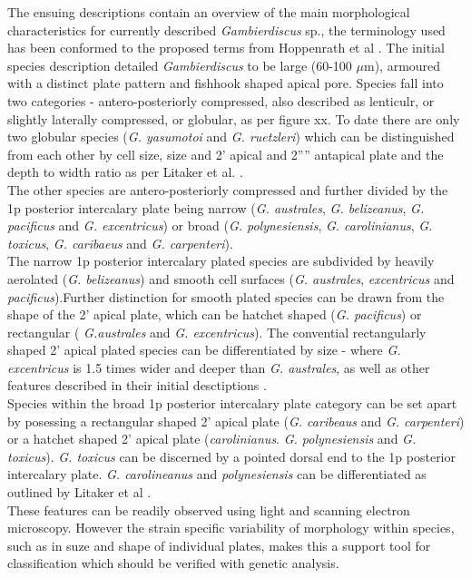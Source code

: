 \documentclass[12pt]{article}
\begin{document}
The ensuing descriptions contain an overview of the main morphological characteristics for currently described \emph{Gambierdiscus} sp., the terminology used has been conformed to the proposed terms from Hoppenrath et al \cite{hoppenrath2013taxonomy}. The initial species description detailed \emph{Gambierdiscus} to be large (60-100 $\mu$m), armoured with a distinct plate pattern and fishhook shaped apical pore. Species fall into two categories - antero-posteriorly compressed, also described as lenticulr, or slightly laterally compressed, or globular, as per figure xx. To date there are only two globular species (\emph{G. yasumotoi} and \emph{G. ruetzleri}) which can be distinguished from each other by cell size, size and 2' apical and 2'''' antapical plate and the depth to width ratio as per Litaker et al. \cite{litaker2009taxonomy}. \\
The other species are antero-posteriorly compressed and further divided by the 1p posterior intercalary plate being narrow (\emph{G. australes}, \emph{G. belizeanus}, \emph{G. pacificus} and \emph{G. excentricus}) or broad (\emph{G. polynesiensis}, \emph{G. carolinianus}, \emph{G. toxicus}, \emph{G. caribaeus} and \emph{G. carpenteri}). \\
The narrow 1p posterior intercalary plated species are subdivided by heavily aerolated (\emph{G. belizeanus}) and smooth cell surfaces (\emph{G. australes}, \emph{excentricus} and \emph{pacificus}).Further distinction for smooth plated species can be drawn from the shape of the 2' apical plate, which can be hatchet shaped (\emph{G. pacificus}) or rectangular ( \emph{G.australes} and \emph{G. excentricus}). The convential rectangularly shaped 2' apical plated species can be differentiated by size - where \emph{G. excentricus} is 1.5 times wider and deeper than \emph{G. australes}, as well as other features described in their initial desctiptions \cite{chinain1999morphology,fraga2011gambierdiscus}. \\
Species within the broad 1p posterior intercalary plate category can be set apart by posessing a rectangular shaped 2' apical plate (\emph{G. caribeaus} and \emph{G. carpenteri}) or a hatchet shaped 2' apical plate (\emph{carolinianus}. \emph{G. polynesiensis} and \emph{G. toxicus}).
\emph{G. toxicus} can be discerned by a pointed dorsal end to the 1p posterior intercalary plate. \emph{G. carolineanus} and \emph{polynesiensis} can be differentiated as outlined by Litaker et al \cite{litaker2009taxonomy}. \\
These features can be readily observed using light and scanning electron microscopy. However the strain specific variability of morphology within species, such as in suze and shape of individual plates, makes this a support tool for classification which should be verified with genetic analysis. %
\end{document}
